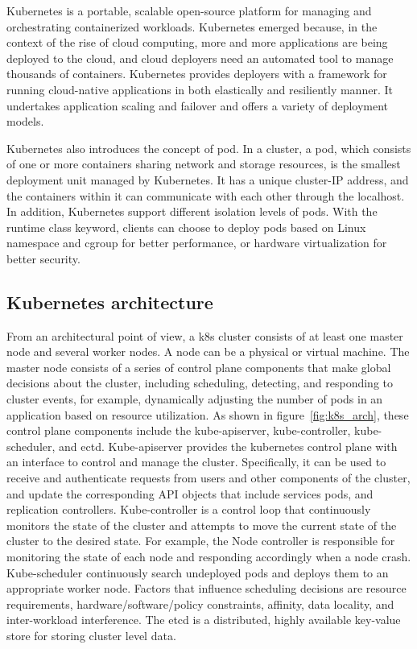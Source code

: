 Kubernetes\cite*{k8s} is a portable, scalable open-source platform for managing and orchestrating containerized workloads. Kubernetes emerged because, in the context of the rise of cloud computing, more and more applications are being deployed to the cloud, 
and cloud deployers need an automated tool to manage thousands of containers. Kubernetes provides deployers with a framework for running cloud-native applications\cite*{KRATZKE20171} in both elastically and resiliently manner. 
It undertakes application scaling and failover and offers a variety of deployment models.

Kubernetes also introduces the concept of pod. In a cluster, a pod, which consists of one or more containers sharing network and storage resources, is the smallest deployment unit managed by Kubernetes. It has a unique cluster-IP address, and the containers within it 
can communicate with each other through the localhost. In addition, Kubernetes support different isolation levels of pods. With the runtime class keyword, clients can choose to deploy pods based on Linux namespace and cgroup for better performance, 
or hardware virtualization for better security\cite*{k8s_runtime_class}.


\subsection{Kubernetes architecture}
From an architectural point of view, a k8s cluster consists of at least one master node and several worker nodes. A node can be a physical or virtual machine. The master node consists of a series of control plane components that make global decisions 
about the cluster, including scheduling, detecting, and responding to cluster events, for example, dynamically adjusting the number of 
pods in an application based on resource utilization. As shown in figure~\ref{fig:k8s_arch}, these control plane components include the kube-apiserver, kube-controller, kube-scheduler, and ectd\cite*{k8s}. Kube-apiserver provides the kubernetes control plane with an 
interface to control and manage the cluster. Specifically, it can be used to receive and authenticate requests from users and other components of the cluster, and update the corresponding API objects that include services pods, and replication 
controllers. Kube-controller is a control loop that continuously monitors the state of the cluster and attempts to move the current state of the cluster to the desired state. For example, the Node controller is responsible for monitoring the state 
of each node and responding accordingly when a node crash. Kube-scheduler continuously search undeployed pods and deploys them to an appropriate worker node. Factors that influence scheduling decisions are resource requirements, 
hardware/software/policy constraints, affinity, data locality, and inter-workload interference. The etcd is a distributed, highly available key-value store for storing cluster level data.

